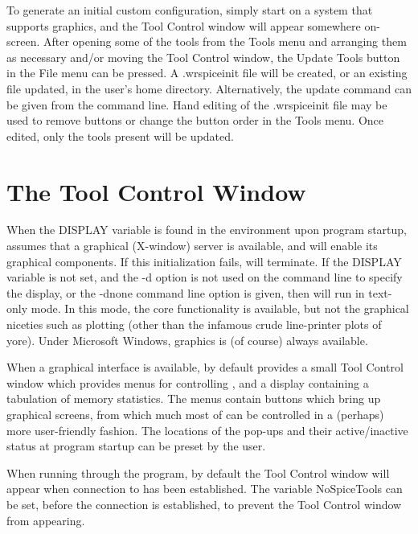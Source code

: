 To generate an initial custom configuration, simply start {\WRspice}
on a system that supports graphics, and the {\cb Tool Control} window
will appear somewhere on-screen.  After opening some of the tools from
the {\cb Tools} menu and arranging them as necessary and/or moving the
{\cb Tool Control} window, the {\cb Update Tools} button in the {\cb
File} menu can be pressed.  A {\vt .wrspiceinit} file will be created,
or an existing file updated, in the user's home directory. 
Alternatively, the {\cb update} command can be given from the command
line.  Hand editing of the {\vt .wrspiceinit} file may be used to
remove buttons or change the button order in the {\cb Tools} menu. 
Once edited, only the tools present will be updated.


\section{The Tool Control Window}
\label{tcwin}


When the {\et DISPLAY} variable is found in the environment upon
program startup, {\WRspice} assumes that a graphical (X-window) server
is available, and will enable its graphical components.  If this
initialization fails, {\WRspice} will terminate.  If the {\et DISPLAY}
variable is not set, and the {\vt -d} option is not used on the
command line to specify the display, or the {\vt -dnone} command line
option is given, then {\WRspice} will run in text-only mode.  In this
mode, the core functionality is available, but not the graphical
niceties such as plotting (other than the infamous crude line-printer
plots of yore).  Under Microsoft Windows, graphics is (of course)
always available.


When a graphical interface is available, {\WRspice} by default
provides a small {\cb Tool Control} window which provides menus for
controlling {\WRspice}, and a display containing a tabulation of
memory statistics.  The menus contain buttons which bring up graphical
screens, from which much most of {\WRspice} can be controlled in a
(perhaps) more user-friendly fashion.  The locations of the pop-ups
and their active/inactive status at program startup can be preset by
the user.

When running {\WRspice} through the {\Xic} program, by default the
{\cb Tool Control} window will appear when connection to {\WRspice}
has been established.  The {\Xic} variable {\et NoSpiceTools} can be
set, before the connection is established, to prevent the {\cb Tool
Control} window from appearing.

